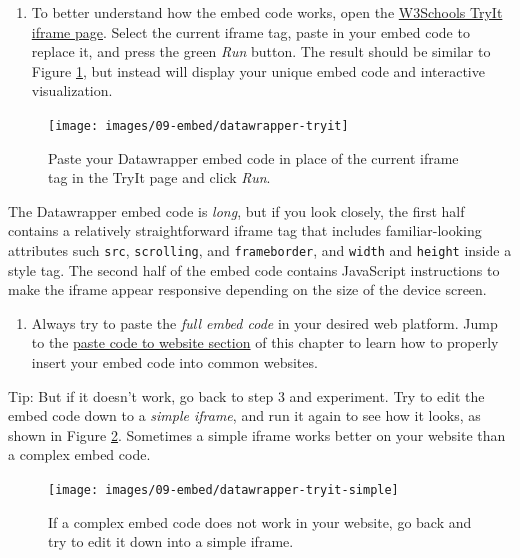 \documentclass[
  english,
]{book}
\providecommand{\tightlist}{%
  \setlength{\itemsep}{0pt}\setlength{\parskip}{0pt}}
\begin{document}
\begin{enumerate}
\def\labelenumi{\arabic{enumi}.}
\setcounter{enumi}{2}
\tightlist
\item
  To better understand how the embed code works, open the \href{https://www.w3schools.com/tags/tryit.asp?filename=tryhtml_iframe}{W3Schools TryIt iframe page}. Select the current iframe tag, paste in your embed code to replace it, and press the green \emph{Run} button. The result should be similar to Figure \ref{fig:datawrapper-tryit}, but instead will display your unique embed code and interactive visualization.
\end{enumerate}



\begin{figure}
\texttt{[image: images/09-embed/datawrapper-tryit]} \caption{Paste your Datawrapper embed code in place of the current iframe tag in the TryIt page and click \emph{Run}.}\label{fig:datawrapper-tryit}
\end{figure}

The Datawrapper embed code is \emph{long}, but if you look closely, the first half contains a relatively straightforward iframe tag that includes familiar-looking attributes such \texttt{src}, \texttt{scrolling}, and \texttt{frameborder}, and \texttt{width} and \texttt{height} inside a style tag. The second half of the embed code contains JavaScript instructions to make the iframe appear responsive depending on the size of the device screen.

\begin{enumerate}
\def\labelenumi{\arabic{enumi}.}
\setcounter{enumi}{3}
\tightlist
\item
  Always try to paste the \emph{full embed code} in your desired web platform. Jump to the \href{paste-code.html}{paste code to website section} of this chapter to learn how to properly insert your embed code into common websites.
\end{enumerate}

Tip: But if it doesn't work, go back to step 3 and experiment. Try to edit the embed code down to a \emph{simple iframe}, and run it again to see how it looks, as shown in Figure \ref{fig:datawrapper-tryit-simple}. Sometimes a simple iframe works better on your website than a complex embed code.



\begin{figure}
\texttt{[image: images/09-embed/datawrapper-tryit-simple]} \caption{If a complex embed code does not work in your website, go back and try to edit it down into a simple iframe.}\label{fig:datawrapper-tryit-simple}
\end{figure}
\end{document}
